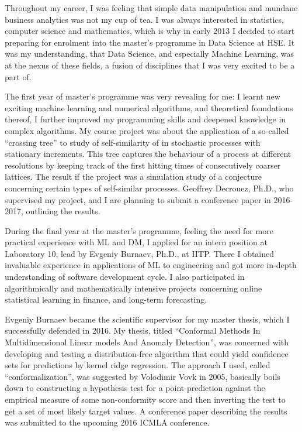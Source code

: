 \documentclass[14pt]{letter}
\begin{document}
Throughout my career, I was feeling that simple data manipulation and mundane business
analytics was not my cup of tea. I was always interested in statistics, computer science
and mathematics, which is why in early 2013 I decided to start preparing for enrolment
into the master's programme in Data Science at HSE. It was my understanding, that
Data Science, and especially Machine Learning, was at the nexus of these fields,
a fusion of disciplines that I was very excited to be a part of. \par\medskip

The first year of master's programme was very revealing for me: I learnt new exciting
machine learning and numerical algorithms, and theoretical foundations thereof, I
further improved my programming skills and deepened knowledge in complex algorithms.
My course project was about the application of a so-called ``crossing tree'' to study
of self-similarity of in stochastic processes with stationary increments. This tree
captures the behaviour of a process at different resolutions by keeping track of the
first hitting times of consecutively coarser lattices. The result if the project was
a simulation study of a conjecture concerning certain types of self-similar processes.
Geoffrey Decrouez, Ph.D., who supervised my project, and I are planning to submit
a conference paper in 2016-2017, outlining the results. \par\medskip

During the final year at the master's programme, feeling the need for more practical
experience with ML and DM, I applied for an intern position at Laboratory 10, lead
by Evgeniy Burnaev, Ph.D., at IITP. There I obtained invaluable experience in applications
of ML to engineering and got more in-depth understanding of software development
cycle. I also participated in algorithmically and mathematically intensive projects
concerning online statistical learning in finance, and long-term forecasting.
\par\medskip

Evgeniy Burnaev became the scientific supervisor for my master thesis, which I successfully 
defended in 2016. My thesis, titled ``Conformal Methods In Multidimensional Linear models
And Anomaly Detection'', was concerned with developing and testing a distribution-free
algorithm that could yield confidence sets for predictions by kernel ridge regression.
The approach I used, called ``conformalization'', was suggested by Volodimir Vovk
in 2005, basically boils down to constructing a hypothesis test for a point-prediction
against the empirical measure of some non-conformity score and then inverting the test
to get a set of most likely target values. A conference paper describing the results
was submitted to the upcoming 2016 ICMLA conference. \par\medskip
\end{document}

